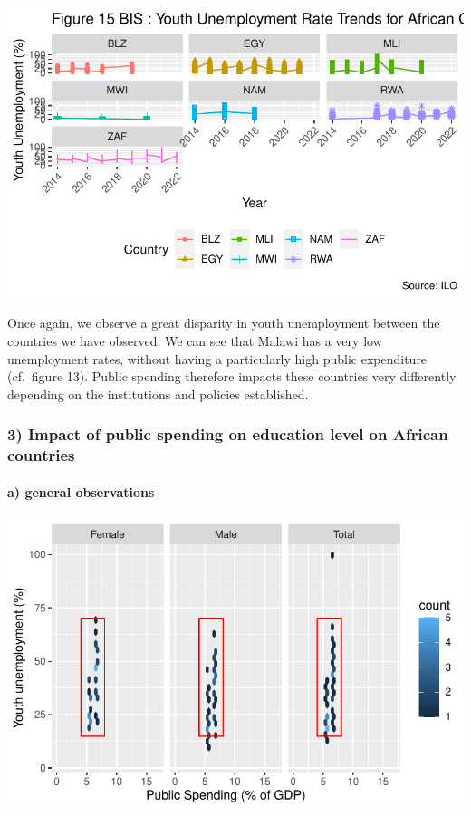\documentclass[
  letterpaper,
  DIV=11,
  numbers=noendperiod]{scrartcl}
\let\oldparagraph\paragraph
\renewcommand{\paragraph}[1]{\oldparagraph{#1}\mbox{}}
\begin{document}
\includegraphics{Projet-BM_files/figure-pdf/unnamed-chunk-30-1.pdf}

Once again, we observe a great disparity in youth unemployment between
the countries we have observed. We can see that Malawi has a very low
unemployment rates, without having a particularly high public
expenditure (cf.~figure 13). Public spending therefore impacts these
countries very differently depending on the institutions and policies
established.

\hypertarget{impact-of-public-spending-on-education-level-on-african-countries}{%
\subsubsection{3) Impact of public spending on education level on
African
countries}\label{impact-of-public-spending-on-education-level-on-african-countries}}

\hypertarget{a-general-observations-1}{%
\paragraph{a) general observations}\label{a-general-observations-1}}

\includegraphics{Projet-BM_files/figure-pdf/unnamed-chunk-31-1.pdf}
\end{document}

